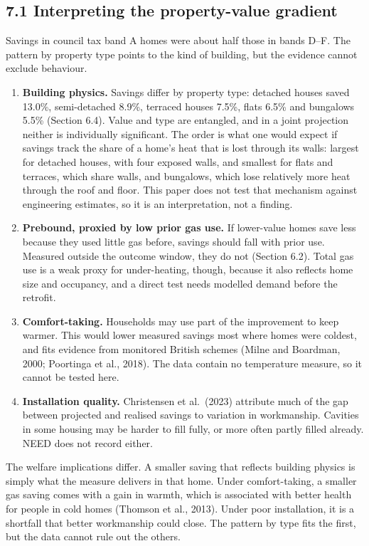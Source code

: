 \documentclass[11pt,a4paper]{article}
\providecommand{\tightlist}{\setlength{\itemsep}{0pt}\setlength{\parskip}{0pt}}
\begin{document}
\subsection*{7.1 Interpreting the property-value gradient}

Savings in council tax band A homes were about half those in bands D--F. The pattern by property type points to the kind of building, but the evidence cannot exclude behaviour.

\begin{enumerate}
\def\labelenumi{\arabic{enumi}.}
\tightlist
\item
  \textbf{Building physics.} Savings differ by property type: detached houses saved 13.0\%, semi-detached 8.9\%, terraced houses 7.5\%, flats 6.5\% and bungalows 5.5\% (Section 6.4). Value and type are entangled, and in a joint projection neither is individually significant. The order is what one would expect if savings track the share of a home's heat that is lost through its walls: largest for detached houses, with four exposed walls, and smallest for flats and terraces, which share walls, and bungalows, which lose relatively more heat through the roof and floor. This paper does not test that mechanism against engineering estimates, so it is an interpretation, not a finding.
\item
  \textbf{Prebound, proxied by low prior gas use.} If lower-value homes save less because they used little gas before, savings should fall with prior use. Measured outside the outcome window, they do not (Section 6.2). Total gas use is a weak proxy for under-heating, though, because it also reflects home size and occupancy, and a direct test needs modelled demand before the retrofit.
\item
  \textbf{Comfort-taking.} Households may use part of the improvement to keep warmer. This would lower measured savings most where homes were coldest, and fits evidence from monitored British schemes (Milne and Boardman, 2000; Poortinga et al., 2018). The data contain no temperature measure, so it cannot be tested here.
\item
  \textbf{Installation quality.} Christensen et al.~(2023) attribute much of the gap between projected and realised savings to variation in workmanship. Cavities in some housing may be harder to fill fully, or more often partly filled already. NEED does not record either.
\end{enumerate}

The welfare implications differ. A smaller saving that reflects building physics is simply what the measure delivers in that home. Under comfort-taking, a smaller gas saving comes with a gain in warmth, which is associated with better health for people in cold homes (Thomson et al., 2013). Under poor installation, it is a shortfall that better workmanship could close. The pattern by type fits the first, but the data cannot rule out the others.
\end{document}
